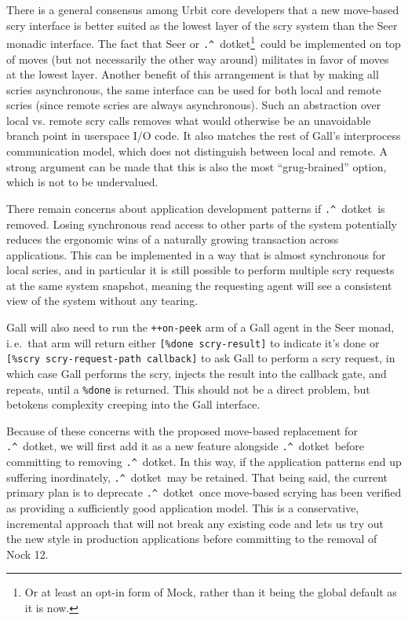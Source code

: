 \documentclass[twoside]{article}
\newcommand{\dotket}{\lstinline[style=inlinecode]{.^}~dotket}
\begin{document}
There is a general consensus among Urbit core developers that a new move-based scry interface is better suited as the lowest layer of the scry system than the Seer monadic interface.  The fact that Seer or \dotket\footnote{Or at least an opt-in form of Mock, rather than it being the global default as it is now.}~could be implemented on top of moves (but not necessarily the other way around) militates in favor of moves at the lowest layer.  Another benefit of this arrangement is that by making all scries asynchronous, the same interface can be used for both local and remote scries (since remote scries are always asynchronous).  Such an abstraction over local vs. remote scry calls removes what would otherwise be an unavoidable branch point in userspace I/O code.  It also matches the rest of Gall's interprocess communication model, which does not distinguish between local and remote.  A strong argument can be made that this is also the most ``grug-brained'' option, which is not to be undervalued.

There remain concerns about application development patterns if \dotket~is removed.  Losing synchronous read access to other parts of the system potentially reduces the ergonomic wins of a naturally growing transaction across applications.  This can be implemented in a way that is almost synchronous for local scries, and in particular it is still possible to perform multiple scry requests at the same system snapshot, meaning the requesting agent will see a consistent view of the system without any tearing.

Gall will also need to run the \lstinline[style=inlinecode]{++on-peek} arm of a Gall agent in the Seer monad, i.\,e.\  that arm will return either \lstinline[style=inlinecode]{[%done scry-result]} to indicate it's done or \lstinline[style=inlinecode]{[%scry scry-request-path callback]} to ask Gall to perform a scry request, in which case Gall performs the scry, injects the result into the callback gate, and repeats, until a \lstinline[style=inlinecode]{%done} is returned.  This should not be a direct problem, but betokens complexity creeping into the Gall interface.

Because of these concerns with the proposed move-based replacement for \dotket, we will first add it as a new feature alongside \dotket~before committing to removing \dotket.  In this way, if the application patterns end up suffering inordinately, \dotket~may be retained.  That being said, the current primary plan is to deprecate \dotket~once move-based scrying has been verified as providing a sufficiently good application model.  This is a conservative, incremental approach that will not break any existing code and lets us try out the new style in production applications before committing to the removal of Nock 12.  \tombstone{}

\printbibliography
\end{document}
